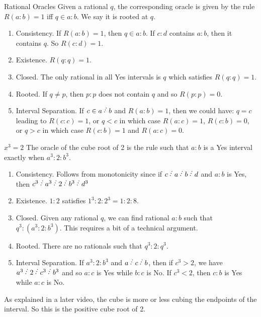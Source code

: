\documentclass{beamer}
\begin{document}
\begin{frame}{Rational Oracles}
    Given a rational $q$, the corresponding oracle is given by the rule $R(a:b) = 1$ iff $q \in a:b$. We say it is rooted at $q$.

    \begin{enumerate}
    \item Consistency. If $R(a:b) = 1$, then $q \in a:b$. If $c:d$ contains $a:b$, then it contains $q$. So $R(c:d) = 1$.
    \pause
    \item Existence. $R(q:q) = 1$. 
    \pause
    \item Closed. The only rational in all Yes intervals is $q$ which satisfies $R(q:q) = 1$. 
    \pause
    \item Rooted. If $q \neq p$, then $p:p$ does not contain $q$ and so $R(p:p) = 0$.
    \pause
    \item Interval Separation. If $c \in a \lte b$ and $R(a:b) = 1$, then we could have: $q = c$ leading to $R(c:c) = 1$, or $ q< c$ in which case $R(a:c) = 1$, $R(c:b) = 0$, or $q > c$ in which case $R(c:b) = 1$ and $R(a:c)=0$. 
    \end{enumerate}
    
\end{frame}


\begin{frame}{\texorpdfstring{$x^3 = 2$}{xcubeeq2}}
    The oracle of the cube root of 2 is the rule such that $a:b$ is a Yes interval exactly when $a^3 : 2 : b^3$.

    \begin{enumerate}
    \item Consistency. Follows from monotonicity since if $c \lte a \lte b \lte d$ and $a:b$ is Yes, then  $c^3 \lte a^3  \lte 2 \lte b^3 \lte d^3$
    \pause
    \item Existence. $1:2$ satisfies $1^3 : 2 : 2^3 = 1:2:8$. 
    \pause
    \item Closed. Given any rational $q$, we can find rational $a:b$ such that $q^3 : ( a^3 : 2 :b^3)$. This requires a bit of a technical argument.
    \pause
    \item Rooted. There are no rationals such that $q^3 : 2 : q^3$.
    \pause
    \item Interval Separation. If $a^3 : 2 : b^3$ and $a\lte c \lte b$, then if $c^3 > 2$, we have $a^3 \lte 2 \lte c^3  \lte b^3$ and so $a:c$ is Yes while $b:c$ is No. If $c^3 < 2$, then $c:b$ is Yes while $a:c$ is No. 
    \end{enumerate}

    As explained in a later video, the cube is more or less cubing the endpoints of the interval. So this is the positive cube root of 2. 
    
\end{frame}
\end{document}
